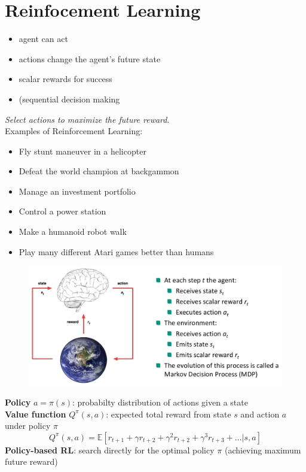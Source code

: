 \section{Reinfocement Learning}
\label{sect:reinforcement-learning}
\begin{itemize}
	\item agent can act
	\item actions change the agent's future state
	\item scalar rewards for success
	\item (sequential decision making
\end{itemize}
\textit{Select actions to maximize the future reward}.\\
Examples of Reinforcement Learning:
\begin{itemize}
	\item Fly stunt maneuver in a	 helicopter
	\item Defeat the world champion at backgammon	
	\item Manage an investment portfolio
	\item Control a power station
	\item Make a humanoid robot walk
	\item Play many different Atari games better than humans	
\end{itemize}
\begin{figure}[h]
\includegraphics[scale=0.4]{agent-and-environment}
\end{figure}
\textbf{Policy} $a = \pi(s)$: probabilty distribution of actions given a state\\
\textbf{Value function} $Q^{\pi}(s, a)$: expected total reward from state $s$ and action $a$ under policy $\pi$
\[
Q^{\pi}(s, a) = \mathbb{E}[r_{t + 1} + \gamma r_{t + 2} + \gamma^2 r_{t + 2} + \gamma^3 r_{t + 3} + ... | s, a]
\]
\textbf{Policy-based RL}: search directly for the optimal policy $\pi$ (achieving maximum future reward)\\
